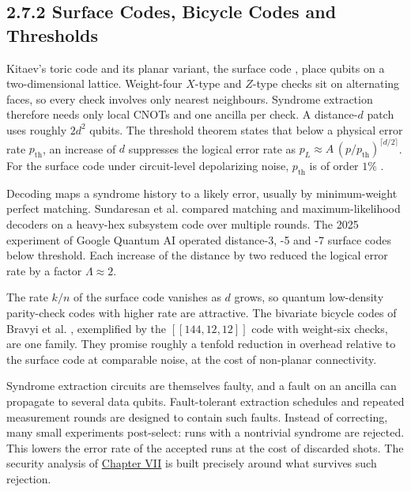 \documentclass{report}
\theoremstyle{plain}
\theoremstyle{definition}
\theoremstyle{remark}
\begin{document}
\subsection{2.7.2 Surface Codes, Bicycle Codes and Thresholds}

Kitaev's toric code \cite{kitaev2003anyons} and its planar variant, the surface code \cite{dennis2002topological,fowler2012surfacecodes}, place qubits on a two-dimensional lattice. Weight-four $X$-type and $Z$-type checks sit on alternating faces, so every check involves only nearest neighbours. Syndrome extraction therefore needs only local CNOTs and one ancilla per check. A distance-$d$ patch uses roughly $2d^2$ qubits. The threshold theorem states that below a physical error rate $p_{\mathrm{th}}$, an increase of $d$ suppresses the logical error rate as $p_L\approx A\,(p/p_{\mathrm{th}})^{\lceil d/2\rceil}$. For the surface code under circuit-level depolarizing noise, $p_{\mathrm{th}}$ is of order $1\%$ \cite{fowler2012surfacecodes}.

Decoding maps a syndrome history to a likely error, usually by minimum-weight perfect matching. Sundaresan et al. \cite{sundaresan2023subsystem} compared matching and maximum-likelihood decoders on a heavy-hex subsystem code over multiple rounds. The 2025 experiment of Google Quantum AI \cite{acharya2025belowthreshold} operated distance-3, -5 and -7 surface codes below threshold. Each increase of the distance by two reduced the logical error rate by a factor $\Lambda\approx2$.

The rate $k/n$ of the surface code vanishes as $d$ grows, so quantum low-density parity-check codes with higher rate are attractive. The bivariate bicycle codes of Bravyi et al. \cite{bravyi2024bicycle}, exemplified by the $[[144,12,12]]$ code with weight-six checks, are one family. They promise roughly a tenfold reduction in overhead relative to the surface code at comparable noise, at the cost of non-planar connectivity.

Syndrome extraction circuits are themselves faulty, and a fault on an ancilla can propagate to several data qubits. Fault-tolerant extraction schedules and repeated measurement rounds are designed to contain such faults. Instead of correcting, many small experiments post-select: runs with a nontrivial syndrome are rejected. This lowers the error rate of the accepted runs at the cost of discarded shots. The security analysis of \hyperref[ch:qec]{Chapter VII} \cite{guo2026qecaudit} is built precisely around what survives such rejection.
\end{document}
